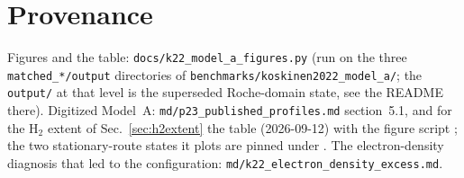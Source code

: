 \documentclass[english,a4paper]{my_memo}
\begin{document}
\section{Provenance}

Figures and the table: \texttt{docs/k22\_model\_a\_figures.py} (run on
the three \texttt{matched\_*/output} directories of
\texttt{benchmarks/koskinen2022\_model\_a/}; the \texttt{output/} at that
level is the superseded Roche-domain state, see the README there).
Digitized Model~A:
\texttt{md/p23\_published\_profiles.md} section~5.1, and for the H$_2$
extent of Sec.~\ref{sec:h2extent} the table
(2026-09-12) with the figure script ; the two
stationary-route states it plots are pinned under
. The electron-density
diagnosis that led to the configuration: \texttt{md/k22\_electron\_density\_excess.md}.
\end{document}
